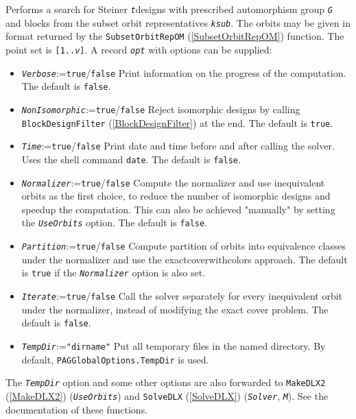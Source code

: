 \documentclass[a4paper,11pt]{report}
\begin{document}
{{{ Performs a search for Steiner \mbox{\texttt{\mdseries\slshape t}}\texttt{}designs with prescribed automorphism group \mbox{\texttt{\mdseries\slshape G}} and blocks from the subset orbit representatives \mbox{\texttt{\mdseries\slshape ksub}}. The orbits may be given in format returned by the \texttt{SubsetOrbitRepOM} (\ref{SubsetOrbitRepOM}) function. The point set is \texttt{[1..}\mbox{\texttt{\mdseries\slshape v}}\texttt{]}. A record \mbox{\texttt{\mdseries\slshape opt}} with options can be supplied: 
\begin{itemize}
\item \mbox{\texttt{\mdseries\slshape Verbose}}:=\texttt{true}/\texttt{false} Print information on the progress of the computation. The default is \texttt{false}.
\item \mbox{\texttt{\mdseries\slshape NonIsomorphic}}:=\texttt{true}/\texttt{false} Reject isomorphic designs by calling \texttt{BlockDesignFilter} (\ref{BlockDesignFilter}) at the end. The default is \texttt{true}.
\item \mbox{\texttt{\mdseries\slshape Time}}:=\texttt{true}/\texttt{false} Print date and time before and after calling the solver. Uses the shell
command \texttt{date}. The default is \texttt{false}.
\item \mbox{\texttt{\mdseries\slshape Normalizer}}:=\texttt{true}/\texttt{false} Compute the normalizer and use inequivalent orbits as the first choice, to
reduce the number of isomorphic designs and speed\texttt{}up the
computation. This can also be achieved "manually" by setting the \mbox{\texttt{\mdseries\slshape UseOrbits}} option. The default is \texttt{false}.
\item \mbox{\texttt{\mdseries\slshape Partition}}:=\texttt{true}/\texttt{false} Compute partition of orbits into equivalence classes under the normalizer and
use the
exact\texttt{}cover\texttt{}with\texttt{}colors
approach. The default is \texttt{true} if the \mbox{\texttt{\mdseries\slshape Normalizer}} option is also set.
\item \mbox{\texttt{\mdseries\slshape Iterate}}:=\texttt{true}/\texttt{false} Call the solver separately for every inequivalent orbit under the normalizer,
instead of modifying the exact cover problem. The default is \texttt{false}.
\item \mbox{\texttt{\mdseries\slshape TempDir}}:=\texttt{"dir{\textunderscore}name"} Put all temporary files in the named directory. By default, \texttt{PAGGlobalOptions.TempDir} is used.
\end{itemize}
 The \mbox{\texttt{\mdseries\slshape TempDir}} option and some other options are also forwarded to \texttt{MakeDLX2} (\ref{MakeDLX2}) (\mbox{\texttt{\mdseries\slshape UseOrbits}}) and \texttt{SolveDLX} (\ref{SolveDLX}) (\mbox{\texttt{\mdseries\slshape Solver}}, \mbox{\texttt{\mdseries\slshape M}}). See the documentation of these functions. }

}}
\end{document}
